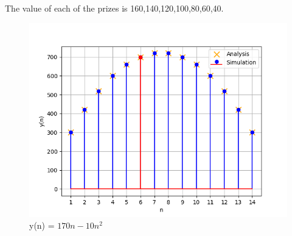 \documentclass[journal,12pt,twocolumn]{IEEEtran}
\theoremstyle{remark}
\begin{document}
The value of each of the prizes is 160,140,120,100,80,60,40.

\begin{figure}[h]
  \centering
  \includegraphics[width=\columnwidth]{figs/fig1.png}
  \caption{y(n) = $170n-10n^2$}
  \label{fig:graph}
\end{figure}
\end{document}
